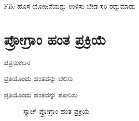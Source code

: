 \textenglish{File}
ಹೊಸ 
ಯೋಜನೆಯನ್ನು ಉಳಿಸು 
ಬೇಡ 
ಸರಿ 
ರದ್ದುಮಾಡು

\section{ಪ್ರೋಗ್ರಾಂ ಹಂತ ಪ್ರಕ್ರಿಯೆ}

ಚಿತ್ರಸಂಕಲನ

ಪ್ರತಿಯೊಂದು ಹಂತವನ್ನು ಚಲಿಸು 

ಪ್ರತಿಯೊಂದು ಹಂತವನ್ನು ತೋರಿಸು  


\begin{figure}[h]
\begin{center}
\begin{Scratch}[1]
\beginbox{}
\end{Scratch}
\end{center}
\caption{ಸ್ಕ್ರಾಚ್ ಪ್ರೋಗ್ರಾಂ ಹಂತ ಪ್ರಕ್ರಿಯೆ}
\label{hdr_sstep}
\end{figure}